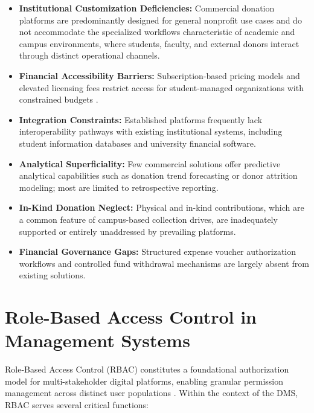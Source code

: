 \documentclass{thesis-library}
\begin{document}
\begin{itemize}
    \item \textbf{Institutional Customization Deficiencies:} Commercial donation platforms are predominantly designed for general nonprofit use cases and do not accommodate the specialized workflows characteristic of academic and campus environments, where students, faculty, and external donors interact through distinct operational channels.
    \item \textbf{Financial Accessibility Barriers:} Subscription-based pricing models and elevated licensing fees restrict access for student-managed organizations with constrained budgets \cite{sanchez2019framework}.
    \item \textbf{Integration Constraints:} Established platforms frequently lack interoperability pathways with existing institutional systems, including student information databases and university financial software.
    \item \textbf{Analytical Superficiality:} Few commercial solutions offer predictive analytical capabilities such as donation trend forecasting or donor attrition modeling; most are limited to retrospective reporting.
    \item \textbf{In-Kind Donation Neglect:} Physical and in-kind contributions, which are a common feature of campus-based collection drives, are inadequately supported or entirely unaddressed by prevailing platforms.
    \item \textbf{Financial Governance Gaps:} Structured expense voucher authorization workflows and controlled fund withdrawal mechanisms are largely absent from existing solutions.
\end{itemize}

\section{Role-Based Access Control in Management Systems}

Role-Based Access Control (RBAC) constitutes a foundational authorization model for multi-stakeholder digital platforms, enabling granular permission management across distinct user populations \cite{sandhu1996rbac}. Within the context of the DMS, RBAC serves several critical functions:
\end{document}

